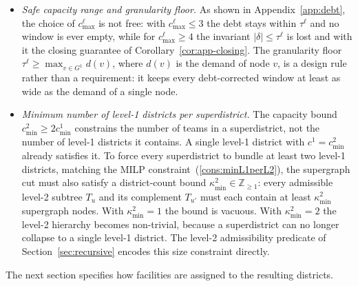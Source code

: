 \documentclass[11pt]{article}
\theoremstyle{definition}
\begin{document}
\begin{itemize}
        \item \emph{Safe capacity range and granularity floor.} As shown in Appendix~\ref{app:debt}, the choice of $c^{\ell}_{\max}$ is not free: with $c^{\ell}_{\max} \leq 3$ the debt stays within $\tau^{\ell}$ and no window is ever empty, while for $c^{\ell}_{\max} \geq 4$ the invariant $|\delta| \leq \tau^{\ell}$ is lost and with it the closing guarantee of Corollary~\ref{cor:app-closing}. The granularity floor $\tau^{\ell} \geq \max_{v \in G^1} d(v)$, where $d(v)$ is the demand of node $v$, is a design rule rather than a requirement: it keeps every debt-corrected window at least as wide as the demand of a single node.
    
    \item \emph{Minimum number of level-1 districts per superdistrict.}
    The capacity bound $c^2_{\min} \geq 2 c^1_{\min}$ constrains the number of teams in a superdistrict, not the number of level-1 districts it contains. A single level-1 district with $c^1 = c^2_{\min}$ already satisfies it. To force every
    superdistrict to bundle at least two level-1 districts, matching
    the MILP constraint~(\ref{cons:minL1perL2}), the supergraph cut
    must also satisfy a district-count bound
    $\kappa^2_{\min} \in \mathbb{Z}_{\geq 1}$: every admissible
    level-2 subtree $T_u$ and its complement $T_{u'}$ must each
    contain at least $\kappa^2_{\min}$ supergraph nodes. With $\kappa^2_{\min} = 1$ the bound is vacuous. With $\kappa^2_{\min} = 2$ the level-2 hierarchy becomes non-trivial, because a superdistrict can no longer collapse to a single level-1 district. The level-2 admissibility predicate
    of Section~\ref{sec:recursive} encodes this size constraint
    directly.
    
    \end{itemize}


The next section specifies how facilities are assigned to the resulting districts.

\end{document}
